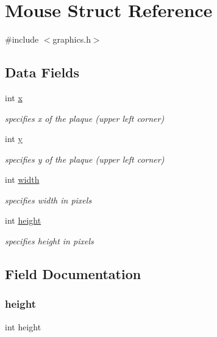 \hypertarget{struct_mouse}{}\section{Mouse Struct Reference}
\label{struct_mouse}


{\ttfamily \#include $<$graphics.\+h$>$}

\subsection*{Data Fields}
\begin{DoxyCompactItemize}
\item 
int \hyperlink{struct_mouse_a6150e0515f7202e2fb518f7206ed97dc}{x}
\begin{DoxyCompactList}\small\item\em specifies x of the plaque (upper left corner) \end{DoxyCompactList}\item 
int \hyperlink{struct_mouse_a0a2f84ed7838f07779ae24c5a9086d33}{y}
\begin{DoxyCompactList}\small\item\em specifies y of the plaque (upper left corner) \end{DoxyCompactList}\item 
int \hyperlink{struct_mouse_a2474a5474cbff19523a51eb1de01cda4}{width}
\begin{DoxyCompactList}\small\item\em specifies width in pixels \end{DoxyCompactList}\item 
int \hyperlink{struct_mouse_ad12fc34ce789bce6c8a05d8a17138534}{height}
\begin{DoxyCompactList}\small\item\em specifies height in pixels \end{DoxyCompactList}\end{DoxyCompactItemize}


\subsection{Field Documentation}
\mbox{\label{struct_mouse_ad12fc34ce789bce6c8a05d8a17138534}} 
\subsubsection{\texorpdfstring{height}{height}}
{\footnotesize\ttfamily int height}



